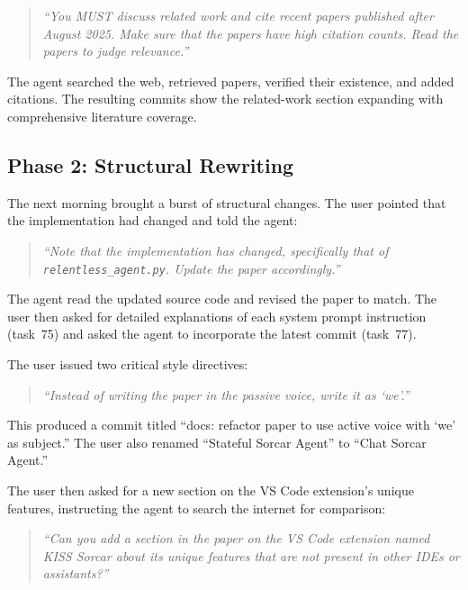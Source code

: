 \documentclass{article}
\begin{document}
\begin{quote}
\textit{``You MUST discuss related work and cite recent papers published after August 2025.  Make sure that the papers have high citation counts.  Read the papers to judge relevance.''}
\end{quote}

The agent searched the web, retrieved papers, verified their existence, and added citations.  The resulting commits show the related-work section expanding with comprehensive literature coverage.

\subsection{Phase 2: Structural Rewriting}
\label{sec:phase2}

The next morning brought a burst of structural changes.  The user pointed that the implementation had changed and told the agent:

\begin{quote}
\textit{``Note that the implementation has changed, specifically that of \texttt{relentless\hspace{0pt}\_agent.py}.  Update the paper accordingly.''}
\end{quote}

The agent read the updated source code and revised the paper to match.  The user then asked for detailed explanations of each system prompt instruction (task~75) and asked the agent to incorporate the latest commit (task~77).

The user issued two critical style directives:

\begin{quote}
\textit{``Instead of writing the paper in the passive voice, write it as `we'.''}
\end{quote}

This produced a commit titled ``docs: refactor paper to use active voice with `we' as subject.''  The user also renamed ``Stateful Sorcar Agent'' to ``Chat Sorcar Agent.''

The user then asked for a new section on the VS Code extension's unique features, instructing the agent to search the internet for comparison:

\begin{quote}
\textit{``Can you add a section in the paper on the VS Code extension named KISS Sorcar about its unique features that are not present in other IDEs or assistants?''}
\end{quote}
\end{document}
